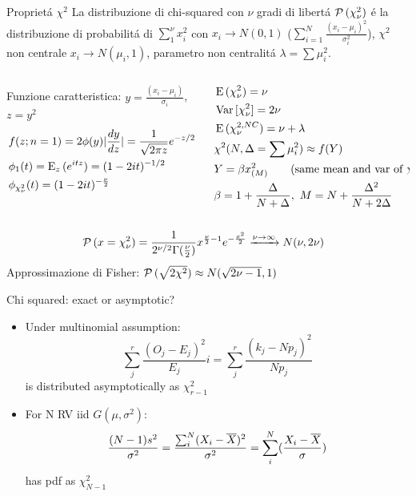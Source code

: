 \documentclass[asd-beamer.tex]{subfiles}%
\begin{document}
\begin{frame}{Propriet\'a $\chi^2$}
La distribuzione di chi-squared con $\nu$ gradi di libert\'a $\prob{(\chi_{\nu}^2)}$ \'e la distribuzione di probabilit\'a di $\sum_1^{\nu}x_i^2$ con $x_i\to N(0,1)$ ($\sum_{i=1}^N\frac{(x_i-\mu_i)^2}{\sigma_i^2}$), $\chi^2$ non centrale $x_i\to N(\mu_i,1)$, parametro non centralit\'a $\lambda=\sum\mu_i^2$.
\begin{columns}[T]
	\begin{column}{0.7\textwidth}
Funzione caratteristica: $y=\frac{(x_i-\mu_i)}{\sigma_i}$, $z=y^2$
		\begin{align*}
		&f(z;n=1)=2\phi(y)|\TDy{z}{y}|=\frac{1}{\sqrt{2\pi z}}\exp{-z/2}\\
		&\phi_1(t)=\E_z{(\exp{itz})}=(1-2it)\expy{-1/2}\\
		&\phi_{\chi^2_{\nu}}(t)=(1-2it)\expy{-\frac{\nu}{2}}
		\end{align*}
	\end{column}
	\begin{column}{0.3\textwidth}
		\begin{align*}
		&\E{(\chi^2_{\nu})}=\nu\\
		&\var{[\chi_{\nu}^2]}=2\nu\\
		&\E{(\chi^{2,NC}_{\nu})}=\nu+\lambda\\
        &\chi^2(N,\Delta=\sum\mu_i^2)\approx f(Y)\\
        &Y=\beta x^2_{(M)}\tag{same mean and var of $\chi^2_{NC}$}\\
        &\beta=1+\frac{\Delta}{N+\Delta},\ M=N+\frac{\Delta^2}{N+2\Delta}
		\end{align*}
	\end{column}
\end{columns}
\begin{align*}
&\prob{(x=\chi^2_{\nu})}=\frac{1}{2\expy{\nu/2}\Gamma(\frac{\nu}{2})}x\expy{\frac{\nu}{2}-1}\exp{-\frac{x^2}{2}}\xrightarrow{\nu\to\infty}N(\nu,2\nu)
\end{align*}
Approssimazione di Fisher: $\prob{(\sqrt{2\chi^2})}\approx N(\sqrt{2\nu-1},1)$
\end{frame}

\begin{frame}{Chi squared: exact or asymptotic?}
    \begin{itemize}
        \item Under multinomial assumption:
            \[\sum_j^r\frac{(O_j-E_j)^2}{E_j}i=\sum_j^r\frac{(k_j-Np_j)^2}{Np_j}\]
            is distributed asymptotically as $\chi^2_{r-1}$
        \item For N RV iid $G(\mu,\sigma^2)$:
            \[\frac{(N-1)s^2}{\sigma^2}=\frac{\sum_i^N(X_i-\smean{X})^2}{\sigma^2}=\sum_i^N(\frac{X_i-\smean{X}}{\sigma})\]
            has pdf as $\chi^2_{N-1}$
    \end{itemize}
\end{frame}
\end{document}

